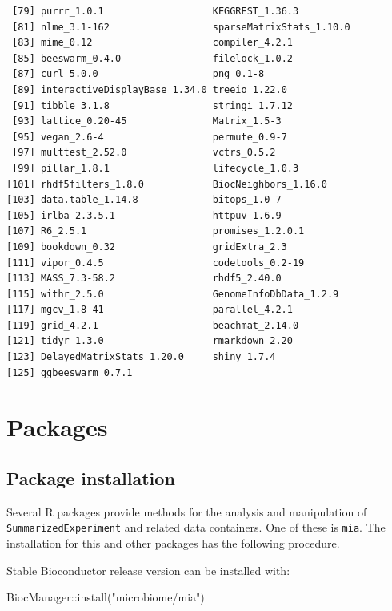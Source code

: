 \documentclass[
]{book}
\newenvironment{Shaded}{\begin{snugshade}}{\end{snugshade}}
\newcommand{\FunctionTok}[1]{\textcolor[rgb]{0.00,0.00,0.00}{#1}}
\newcommand{\NormalTok}[1]{#1}
\newcommand{\SpecialCharTok}[1]{\textcolor[rgb]{0.00,0.00,0.00}{#1}}
\newcommand{\StringTok}[1]{\textcolor[rgb]{0.31,0.60,0.02}{#1}}
\begin{document}
\begin{verbatim}
 [79] purrr_1.0.1                   KEGGREST_1.36.3              
 [81] nlme_3.1-162                  sparseMatrixStats_1.10.0     
 [83] mime_0.12                     compiler_4.2.1               
 [85] beeswarm_0.4.0                filelock_1.0.2               
 [87] curl_5.0.0                    png_0.1-8                    
 [89] interactiveDisplayBase_1.34.0 treeio_1.22.0                
 [91] tibble_3.1.8                  stringi_1.7.12               
 [93] lattice_0.20-45               Matrix_1.5-3                 
 [95] vegan_2.6-4                   permute_0.9-7                
 [97] multtest_2.52.0               vctrs_0.5.2                  
 [99] pillar_1.8.1                  lifecycle_1.0.3              
[101] rhdf5filters_1.8.0            BiocNeighbors_1.16.0         
[103] data.table_1.14.8             bitops_1.0-7                 
[105] irlba_2.3.5.1                 httpuv_1.6.9                 
[107] R6_2.5.1                      promises_1.2.0.1             
[109] bookdown_0.32                 gridExtra_2.3                
[111] vipor_0.4.5                   codetools_0.2-19             
[113] MASS_7.3-58.2                 rhdf5_2.40.0                 
[115] withr_2.5.0                   GenomeInfoDbData_1.2.9       
[117] mgcv_1.8-41                   parallel_4.2.1               
[119] grid_4.2.1                    beachmat_2.14.0              
[121] tidyr_1.3.0                   rmarkdown_2.20               
[123] DelayedMatrixStats_1.20.0     shiny_1.7.4                  
[125] ggbeeswarm_0.7.1             
\end{verbatim}

\hypertarget{packages}{%
\chapter{Packages}\label{packages}}

\hypertarget{package-installation}{%
\section{Package installation}\label{package-installation}}

Several R packages provide methods for the analysis and manipulation
of \texttt{SummarizedExperiment} and related data containers. One of these is
\texttt{mia}. The installation for this and other packages has the following
procedure.

Stable Bioconductor release version can be installed with:

\begin{Shaded}
\begin{Highlighting}[]
\NormalTok{BiocManager}\SpecialCharTok{::}\FunctionTok{install}\NormalTok{(}\StringTok{"microbiome/mia"}\NormalTok{)}
\end{Highlighting}
\end{Shaded}
\end{document}
